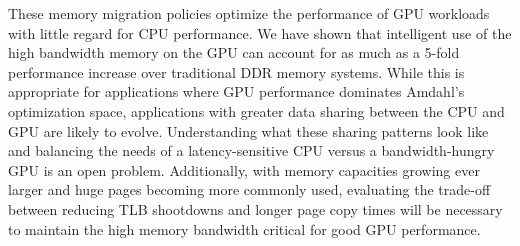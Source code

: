 These memory migration policies optimize the performance of GPU workloads with little regard for CPU
performance.  We have
shown that intelligent use of the high bandwidth memory on the GPU can account for as much as a 5-fold performance
increase over traditional DDR memory systems.
While this is appropriate for applications where GPU performance dominates Amdahl's optimization
space, applications with greater data sharing between the CPU and GPU are likely to evolve. 
{\color{black}Understanding
what these sharing patterns look like and balancing the needs of a latency-sensitive CPU
versus a bandwidth-hungry GPU is an open problem. Additionally, with memory capacities growing ever larger and huge pages becoming
more commonly used, evaluating the trade-off between reducing TLB shootdowns and longer page copy
times will be necessary to maintain the high memory bandwidth critical for good GPU performance.}
